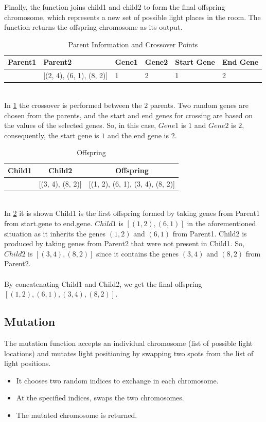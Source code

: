 \documentclass[conference]{IEEEtran}
\begin{document}
Finally, the function joins child1 and child2 to form the final offspring chromosome, which represents a new set of possible light places in the room. The function returns the offspring chromosome as its output.
\begin{table}[h!]
  \centering
  \caption{Parent Information and Crossover Points}
  \begin{tabular}{|p{1.5cm}|p{1.5cm}|p{0.5cm}|p{0.5cm}|p{0.5cm}|p{0.5cm}|}
    \hline
    Parent1 & Parent2 & Gene1 & Gene2 & Start Gene & End Gene \\
    \hline
    [(1, 2), (3, 4), (5, 6)] & [(2, 4), (6, 1), (8, 2)] & 1 & 2 & 1 & 2 \\
    \hline
  \end{tabular}
  \label{parent-info}
\end{table}
\\ In \ref{parent-info} the crossover is performed between the $2$ parents. Two random genes are chosen from the parents, and the start and end genes for crossing are based on the values of the selected genes. So, in this case, $Gene1$ is $1$ and $Gene2$ is $2$, consequently, the start gene is $1$ and the end gene is $2$.
\begin{table}[h!]
  \centering
    \caption{Offspring}

  \begin{tabular}{|c|c|c|}
    \hline
    Child1 & Child2 & Offspring \\
    \hline
    [(1, 2), (6, 1)] & [(3, 4), (8, 2)] & [(1, 2), (6, 1), (3, 4), (8, 2)] \\
    \hline
  \end{tabular}
  \label{offspring}
\end{table}
\\ In \ref{offspring} it is shown Child1 is the first offspring formed by taking genes from Parent1 from start.gene to end.gene. $Child1$ is $[(1, 2), (6, 1)]$ in the aforementioned situation as it inherits the genes $(1, 2)$ and $(6, 1)$ from Parent1. Child2 is produced by taking genes from Parent2 that were not present in Child1. So, $Child2$ is $[(3, 4), (8, 2)]$ since it contains the genes $(3, 4)$ and $(8, 2)$ from Parent2.\\\\
By concatenating Child1 and Child2, we get the final offspring $[(1, 2), (6, 1), (3, 4), (8, 2)]$.



\subsection{Mutation}
The mutation function accepts an individual chromosome (list of possible light locations) and mutates light positioning by swapping two spots from the list of light positions.\\ 
\begin{itemize}
    \item It chooses two random indices to exchange in each chromosome.
    \item  At the specified indices, swaps the two chromosomes.
    \item The mutated chromosome is returned.\\ 
\end{itemize}
\end{document}
